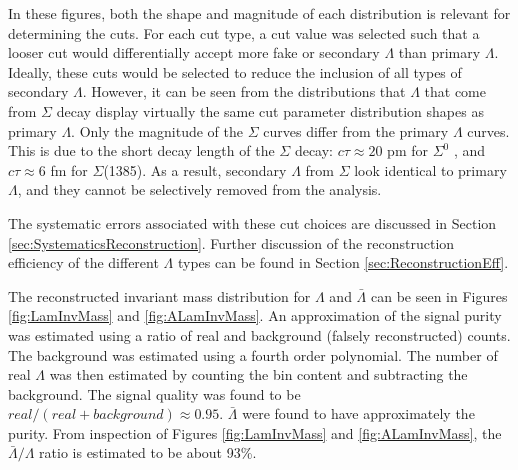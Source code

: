 In these figures, both the shape and magnitude of each distribution is relevant for determining the cuts. For each cut type, a cut value was selected such that a looser cut would differentially accept more fake or secondary $\Lambda$ than primary $\Lambda$. Ideally, these cuts would be selected to reduce the inclusion of all types of secondary $\Lambda$.  However, it can be seen from the distributions that $\Lambda$ that come from $\Sigma$ decay display virtually the same cut parameter distribution shapes as primary $\Lambda$.  Only the magnitude of the $\Sigma$ curves differ from the primary $\Lambda$ curves.  This is due to the short decay length of the $\Sigma$ decay: $c\tau \approx 20$ pm for $\Sigma^0$ , and $c\tau \approx 6$ fm for $\Sigma$(1385). As a result, secondary $\Lambda$ from $\Sigma$ look identical to primary $\Lambda$, and they cannot be selectively removed from the analysis.

The systematic errors associated with these cut choices are discussed in Section \ref{sec:SystematicsReconstruction}. Further discussion of the reconstruction efficiency of the different $\Lambda$ types can be found in Section \ref{sec:ReconstructionEff}.

The reconstructed invariant mass distribution for $\Lambda$ and $\bar{\Lambda}$ can be seen in Figures \ref{fig:LamInvMass} and \ref{fig:ALamInvMass}. An approximation of the signal purity was estimated using a ratio of real and background (falsely reconstructed) counts.  The background was estimated using a fourth order polynomial.  The number of real $\Lambda$ was then estimated by counting the bin content and subtracting the background. The signal quality was found to be $real/(real + background) \approx 0.95$.  $\bar{\Lambda}$ were found to have approximately the purity.  From inspection of Figures \ref{fig:LamInvMass} and \ref{fig:ALamInvMass}, the $\bar{\Lambda}/\Lambda$ ratio is estimated to be about 93\%.

